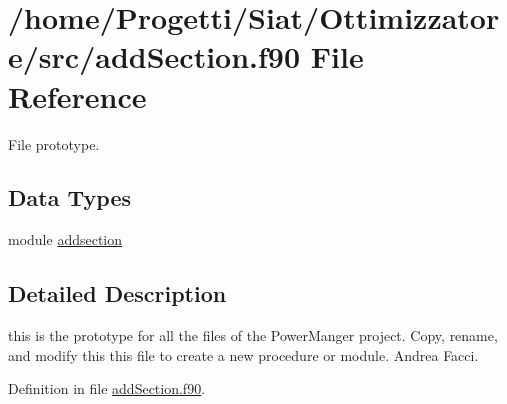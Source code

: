 \hypertarget{add_section_8f90}{\section{/home/\-Progetti/\-Siat/\-Ottimizzatore/src/add\-Section.f90 File Reference}
\label{add_section_8f90}
}


File prototype.  


\subsection*{Data Types}
\begin{DoxyCompactItemize}
\item 
module \hyperlink{classaddsection}{addsection}
\end{DoxyCompactItemize}


\subsection{Detailed Description}
this is the prototype for all the files of the Power\-Manger project. Copy, rename, and modify this this file to create a new procedure or module.  Andrea Facci. 

Definition in file \hyperlink{add_section_8f90_source}{add\-Section.\-f90}.

